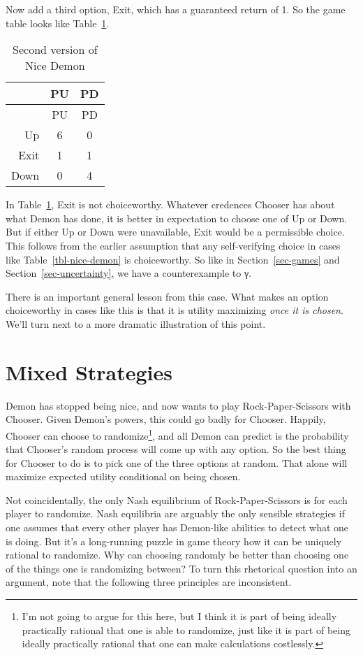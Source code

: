 \documentclass[
  11pt,
  letterpaper,
  DIV=11,
  numbers=noendperiod,
  twoside]{scrartcl}
\begin{document}
Now add a third option, Exit, which has a guaranteed return of 1. So the
game table looks like Table~\ref{tbl-nice-demon-exit}.

\begin{longtable}[]{@{}rcc@{}}
\caption{Second version of Nice
Demon}\label{tbl-nice-demon-exit}\tabularnewline
\toprule\noalign{}
& PU & PD \\
\midrule\noalign{}
\endfirsthead
\toprule\noalign{}
& PU & PD \\
\midrule\noalign{}
\endhead
\bottomrule\noalign{}
\endlastfoot
Up & 6 & 0 \\
Exit & 1 & 1 \\
Down & 0 & 4 \\
\end{longtable}

In Table~\ref{tbl-nice-demon-exit}, Exit is not choiceworthy. Whatever
credences Chooser has about what Demon has done, it is better in
expectation to choose one of Up or Down. But if either Up or Down were
unavailable, Exit would be a permissible choice. This follows from the
earlier assumption that any self-verifying choice in cases like
Table~\ref{tbl-nice-demon} is choiceworthy. So like in
Section~\ref{sec-games} and Section~\ref{sec-uncertainty}, we have a
counterexample to γ.

There is an important general lesson from this case. What makes an
option choiceworthy in cases like this is that it is utility maximizing
\emph{once it is chosen}. We'll turn next to a more dramatic
illustration of this point.

\section{Mixed Strategies}\label{sec-mixed}

Demon has stopped being nice, and now wants to play Rock-Paper-Scissors
with Chooser. Given Demon's powers, this could go badly for Chooser.
Happily, Chooser can choose to randomize\footnote{I'm not going to argue
  for this here, but I think it is part of being ideally practically
  rational that one is able to randomize, just like it is part of being
  ideally practically rational that one can make calculations
  costlessly.}, and all Demon can predict is the probability that
Chooser's random process will come up with any option. So the best thing
for Chooser to do is to pick one of the three options at random. That
alone will maximize expected utility conditional on being chosen.

Not coincidentally, the only Nash equilibrium of Rock-Paper-Scissors is
for each player to randomize. Nash equilibria are arguably the only
sensible strategies if one assumes that every other player has
Demon-like abilities to detect what one is doing. But it's a
long-running puzzle in game theory how it can be uniquely rational to
randomize. Why can choosing randomly be better than choosing one of the
things one is randomizing between? To turn this rhetorical question into
an argument, note that the following three principles are inconsistent.
\end{document}
